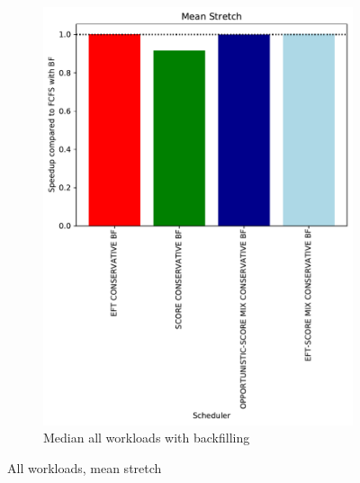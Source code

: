 \documentclass[a4paper]{article}
\begin{document}
\begin{figure}[H]
\begin{subfigure}[b]{0.4\linewidth}\centering\includegraphics[width=1\linewidth]{MBSS/plot/Results_Percentage_FCFS_BF_All_workloads_mediane_Mean_Stretch_450_128_32_256_4_1024.pdf}\caption{Median all workloads with backfilling}\end{subfigure}
\caption{All workloads, mean stretch}\end{figure}
\end{document}
